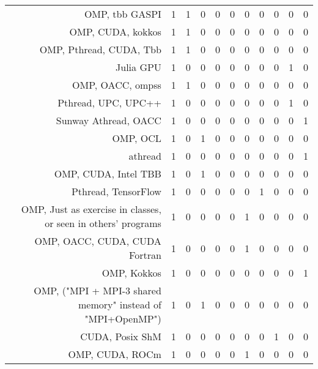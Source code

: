 {\begin{landscape}
\begin{longtable}[htb]{r|c|c|c|c|c|c|c|c|c|c}
{OMP, tbb GASPI} & 1 & 1 & 0 & 0 & 0 & 0 & 0 & 0 & 0 & 0 \\%
{OMP, CUDA, kokkos} & 1 & 1 & 0 & 0 & 0 & 0 & 0 & 0 & 0 & 0 \\%
{OMP, Pthread, CUDA, Tbb} & 1 & 1 & 0 & 0 & 0 & 0 & 0 & 0 & 0 & 0 \\%
{Julia GPU} & 1 & 0 & 0 & 0 & 0 & 0 & 0 & 0 & 1 & 0 \\%
{OMP, OACC, ompss} & 1 & 1 & 0 & 0 & 0 & 0 & 0 & 0 & 0 & 0 \\%
{Pthread, UPC, UPC++} & 1 & 0 & 0 & 0 & 0 & 0 & 0 & 0 & 1 & 0 \\%
{Sunway Athread, OACC} & 1 & 0 & 0 & 0 & 0 & 0 & 0 & 0 & 0 & 1 \\%
{OMP, OCL} & 1 & 0 & 1 & 0 & 0 & 0 & 0 & 0 & 0 & 0 \\%
{athread} & 1 & 0 & 0 & 0 & 0 & 0 & 0 & 0 & 0 & 1 \\%
{OMP, CUDA, Intel TBB} & 1 & 0 & 1 & 0 & 0 & 0 & 0 & 0 & 0 & 0 \\%
{Pthread, TensorFlow} & 1 & 0 & 0 & 0 & 0 & 0 & 1 & 0 & 0 & 0 \\%
{OMP, Just as exercise in classes, or seen in others' programs} & 1 & 0 & 0 & 0 & 0 & 1 & 0 & 0 & 0 & 0 \\%
{OMP, OACC, CUDA, CUDA Fortran} & 1 & 0 & 0 & 0 & 0 & 1 & 0 & 0 & 0 & 0 \\%
{OMP, Kokkos} & 1 & 0 & 0 & 0 & 0 & 0 & 0 & 0 & 0 & 1 \\%
{OMP, ("MPI + MPI-3 shared memory" instead of "MPI+OpenMP")} & 1 & 0 & 1 & 0 & 0 & 0 & 0 & 0 & 0 & 0 \\%
{CUDA, Posix ShM} & 1 & 0 & 0 & 0 & 0 & 0 & 0 & 1 & 0 & 0 \\%
{OMP, CUDA, ROCm} & 1 & 0 & 0 & 0 & 0 & 1 & 0 & 0 & 0 & 0 \\%
\hline%
\end{longtable}%
\end{landscape}}%
\clearpage%
